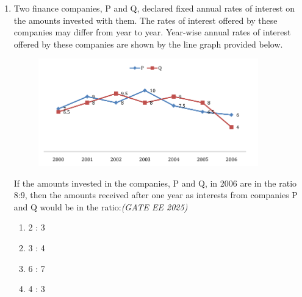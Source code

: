 \documentclass[11pt,a4paper]{article}
\begin{document}
\begin{enumerate}[leftmargin=0pt,label=\textbf{Q.\arabic*}, resume]

\item Two finance companies, P and Q, declared fixed annual rates of interest on the amounts invested with them. The rates of interest offered by these companies may differ from year to year. Year-wise annual rates of interest offered by these companies are shown by the line graph provided below.

\vspace{1em}
\begin{figure}
    \centering
    \includegraphics[width=0.9\textwidth]{imageQ6.png}
\end{figure}
\vspace{1em}
\newpage
If the amounts invested in the companies, P and Q, in 2006 are in the ratio 8:9, then the amounts received after one year as interests from companies P and Q would be in the ratio:\hfill \textit{(GATE EE 2025)}

\begin{multicols}{2}
\begin{enumerate}[label=(\Alph*)]
\item 2 : 3
\item 3 : 4
\item 6 : 7
\item 4 : 3
\end{enumerate}
\end{multicols}


\end{enumerate}
\end{document}
